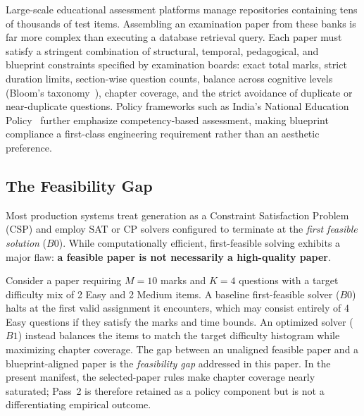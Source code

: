 \documentclass[runningheads]{llncs}
\begin{document}
Large-scale educational assessment platforms manage repositories containing tens of thousands of test items. Assembling an examination paper from these banks is far more complex than executing a database retrieval query. Each paper must satisfy a stringent combination of structural, temporal, pedagogical, and blueprint constraints specified by examination boards: exact total marks, strict duration limits, section-wise question counts, balance across cognitive levels (Bloom's taxonomy~\cite{bloom1956,anderson2001}), chapter coverage, and the strict avoidance of duplicate or near-duplicate questions. Policy frameworks such as India's National Education Policy~\cite{moenep2020} further emphasize competency-based assessment, making blueprint compliance a first-class engineering requirement rather than an aesthetic preference.

\subsection{The Feasibility Gap}
Most production systems treat generation as a Constraint Satisfaction Problem (CSP) and employ SAT or CP solvers configured to terminate at the \emph{first feasible solution} ($B0$). While computationally efficient, first-feasible solving exhibits a major flaw: \textbf{a feasible paper is not necessarily a high-quality paper}.

Consider a paper requiring $M{=}10$ marks and $K{=}4$ questions with a target difficulty mix of 2 Easy and 2 Medium items. A baseline first-feasible solver ($B0$) halts at the first valid assignment it encounters, which may consist entirely of 4 Easy questions if they satisfy the marks and time bounds. An optimized solver ($B1$) instead balances the items to match the target difficulty histogram while maximizing chapter coverage. The gap between an unaligned feasible paper and a blueprint-aligned paper is the \emph{feasibility gap} addressed in this paper. In the present manifest, the selected-paper rules make chapter coverage nearly saturated; Pass~2 is therefore retained as a policy component but is not a differentiating empirical outcome.
\end{document}
